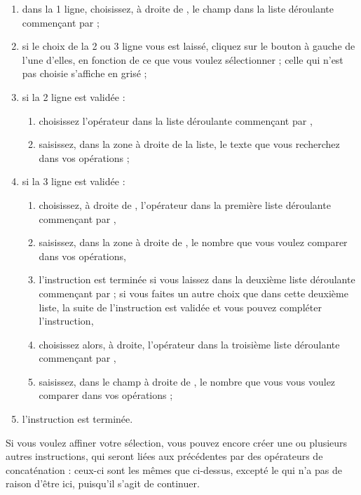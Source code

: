 \begin{enumerate}
	 \item dans la 1 ligne, choisissez, à droite de , le champ dans la liste déroulante commençant par  ; 
	 \item si le choix de la 2 ou 3 ligne vous est laissé, cliquez sur le bouton à gauche de l'une d'elles, en fonction de ce que vous voulez sélectionner ; celle qui n'est pas choisie s'affiche en grisé ; 
	 \item si la 2 ligne est validée :
		\begin{enumerate}
			    \item choisissez l'opérateur dans la liste déroulante commençant par ,
			    \item saisissez, dans la zone à droite de la liste, le texte que vous recherchez dans vos opérations ;
		\end{enumerate}	
	 \item  si la 3 ligne est validée : 	
		\begin{enumerate}
			    \item choisissez, à droite de  , l'opérateur dans la première liste déroulante commençant par ,
			    \item saisissez, dans la zone à droite de , le nombre que vous voulez comparer dans vos opérations,
			    \item l'instruction est terminée si vous laissez  dans la deuxième liste déroulante commençant par  ; si vous faites un autre choix que  dans cette deuxième liste, la suite de l'instruction est validée et vous pouvez compléter l'instruction,
			    \item choisissez alors, à droite, l'opérateur dans la troisième liste déroulante commençant par ,
			    \item saisissez, dans le champ à droite de , le nombre que vous  vous voulez comparer dans vos opérations ;
		\end{enumerate}	
	 \item l'instruction est terminée.
\end{enumerate}

Si vous voulez affiner votre sélection, vous pouvez encore créer une ou
plusieurs autres instructions, qui seront liées aux précédentes par des opérateurs de concaténation : ceux-ci sont les mêmes que ci-dessus, excepté le  qui n'a pas de raison d'être ici, puisqu'il s'agit de continuer. 

